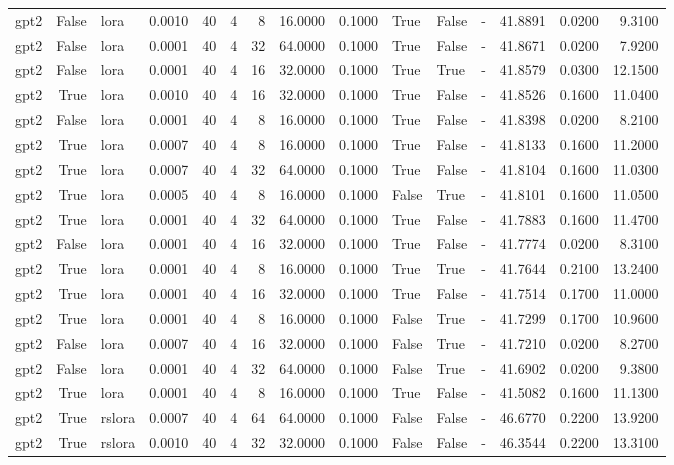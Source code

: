 \begin{tabular}{lrlrrrrrrlllrrr}
gpt2 & False & lora & 0.0010 & 40 & 4 & 8 & 16.0000 & 0.1000 & True & False & - & 41.8891 & 0.0200 & 9.3100 \\
gpt2 & False & lora & 0.0001 & 40 & 4 & 32 & 64.0000 & 0.1000 & True & False & - & 41.8671 & 0.0200 & 7.9200 \\
gpt2 & False & lora & 0.0001 & 40 & 4 & 16 & 32.0000 & 0.1000 & True & True & - & 41.8579 & 0.0300 & 12.1500 \\
gpt2 & True & lora & 0.0010 & 40 & 4 & 16 & 32.0000 & 0.1000 & True & False & - & 41.8526 & 0.1600 & 11.0400 \\
gpt2 & False & lora & 0.0001 & 40 & 4 & 8 & 16.0000 & 0.1000 & True & False & - & 41.8398 & 0.0200 & 8.2100 \\
gpt2 & True & lora & 0.0007 & 40 & 4 & 8 & 16.0000 & 0.1000 & True & False & - & 41.8133 & 0.1600 & 11.2000 \\
gpt2 & True & lora & 0.0007 & 40 & 4 & 32 & 64.0000 & 0.1000 & True & False & - & 41.8104 & 0.1600 & 11.0300 \\
gpt2 & True & lora & 0.0005 & 40 & 4 & 8 & 16.0000 & 0.1000 & False & True & - & 41.8101 & 0.1600 & 11.0500 \\
gpt2 & True & lora & 0.0001 & 40 & 4 & 32 & 64.0000 & 0.1000 & True & False & - & 41.7883 & 0.1600 & 11.4700 \\
gpt2 & False & lora & 0.0001 & 40 & 4 & 16 & 32.0000 & 0.1000 & True & False & - & 41.7774 & 0.0200 & 8.3100 \\
gpt2 & True & lora & 0.0001 & 40 & 4 & 8 & 16.0000 & 0.1000 & True & True & - & 41.7644 & 0.2100 & 13.2400 \\
gpt2 & True & lora & 0.0001 & 40 & 4 & 16 & 32.0000 & 0.1000 & True & False & - & 41.7514 & 0.1700 & 11.0000 \\
gpt2 & True & lora & 0.0001 & 40 & 4 & 8 & 16.0000 & 0.1000 & False & True & - & 41.7299 & 0.1700 & 10.9600 \\
gpt2 & False & lora & 0.0007 & 40 & 4 & 16 & 32.0000 & 0.1000 & False & True & - & 41.7210 & 0.0200 & 8.2700 \\
gpt2 & False & lora & 0.0001 & 40 & 4 & 32 & 64.0000 & 0.1000 & False & True & - & 41.6902 & 0.0200 & 9.3800 \\
gpt2 & True & lora & 0.0001 & 40 & 4 & 8 & 16.0000 & 0.1000 & True & False & - & 41.5082 & 0.1600 & 11.1300 \\
gpt2 & True & rslora & 0.0007 & 40 & 4 & 64 & 64.0000 & 0.1000 & False & False & - & 46.6770 & 0.2200 & 13.9200 \\
gpt2 & True & rslora & 0.0010 & 40 & 4 & 32 & 32.0000 & 0.1000 & False & False & - & 46.3544 & 0.2200 & 13.3100 \\

\end{tabular}
